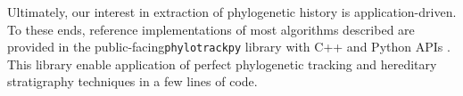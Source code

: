 

Ultimately, our interest in extraction of phylogenetic history is application-driven.
To these ends, reference implementations of most algorithms described are provided in the public-facing\texttt{phylotrackpy} library with C++ and Python APIs \citep{dolson2024phylotrack}.
This library enable application of perfect phylogenetic tracking and hereditary stratigraphy techniques in a few lines of code.
